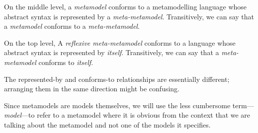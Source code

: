 On the middle level, a \textit{metamodel} conforms to a metamodelling language whose abstract syntax is represented by a \textit{meta-metamodel}.
Transitively, we can say that a \textit{metamodel} conforms to a \textit{meta-metamodel}.

On the top level, A \textit{reflexive meta-metamodel} conforms to a language whose abstract syntax is represented by \textit{itself}.
Transitively, we can say that a \textit{meta-metamodel} conforms to \textit{itself}.

The represented-by and conforms-to relationships are essentially different; arranging them in the same direction might be confusing.

Since metamodels are models themselves, we will use the less cumbersome term---\textit{model}---to refer to a metamodel where it is obvious from the context that we are talking about the metamodel and not one of the models it specifies.  







